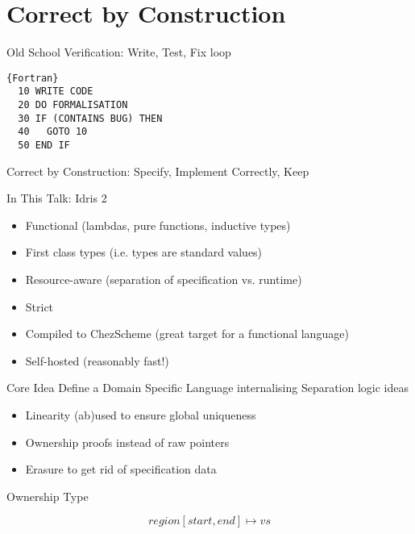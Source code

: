 \section{Correct by Construction}

\newcommand{\mathidris}[1]{{\bf{\mathtt{#1}}}}

\begin{frame}[fragile]{Old School Verification: Write, Test, Fix loop}
\begin{lstlisting}{Fortran}
  10 WRITE CODE
  20 DO FORMALISATION
  30 IF (CONTAINS BUG) THEN
  40   GOTO 10
  50 END IF
\end{lstlisting}
\end{frame}

\begin{frame}{Correct by Construction: Specify, Implement Correctly, Keep}
\end{frame}

\begin{frame}{In This Talk: Idris 2}
  \begin{itemize}
    \item<1-> Functional (lambdas, pure functions, inductive types)
    \item<2-> First class types (i.e. types are standard values)
    \item<3-> Resource-aware (separation of specification vs. runtime)
    \item<4-> Strict
    \item<5-> Compiled to ChezScheme (great target for a functional language)
    \item<6-> Self-hosted (reasonably fast!)
  \end{itemize}
\end{frame}


\begin{frame}{Core Idea}
  Define a Domain Specific Language internalising
  Separation logic ideas

  \begin{itemize}
    \item<2-> Linearity (ab)used to ensure global uniqueness
    \item<3-> Ownership proofs instead of raw pointers
    \item<4-> Erasure to get rid of specification data
  \end{itemize}

\end{frame}

\begin{frame}{Ownership Type}


  $$\mathit{region}[\mathit{start}, \mathit{end}] \mapsto \mathit{vs}$$


\end{frame}

